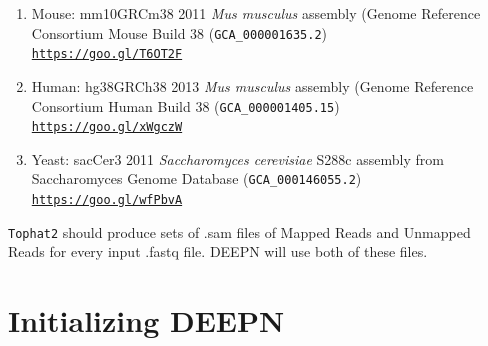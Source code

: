 \documentclass[11pt,fleqn]{book} %
\begin{document}
\begin{enumerate}
	\item Mouse: mm10\/GRCm38 2011 \emph{Mus musculus} assembly (Genome Reference Consortium Mouse Build 38 (\texttt{GCA\_000001635.2})\\
	\texttt{\href{https://goo.gl/T6OT2F}{https://goo.gl/T6OT2F}}
  \item Human: hg38\/GRCh38 2013 \emph{Mus musculus} assembly (Genome Reference Consortium Human Build 38 (\texttt{GCA\_000001405.15})\\
  \texttt{\href{https://goo.gl/xWgczW}{https://goo.gl/xWgczW}}
	\item Yeast: sacCer3 2011 \emph{Saccharomyces cerevisiae} S288c assembly from Saccharomyces Genome Database (\texttt{GCA\_000146055.2})\\
	\texttt{\href{https://goo.gl/wfPbvA}{https://goo.gl/wfPbvA}}
\end{enumerate}

\texttt{Tophat2} should produce sets of .sam files of Mapped Reads and Unmapped Reads for every input .fastq file.  DEEPN will use both of these files.

\section{Initializing DEEPN}
\end{document}
